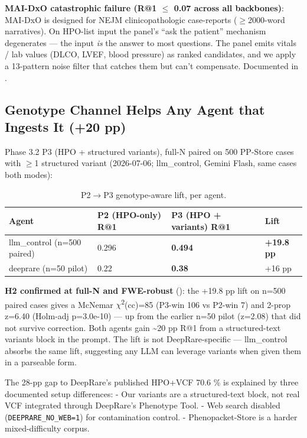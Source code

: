 \textbf{MAI-DxO catastrophic failure (R@1 \ensuremath{\leq} 0.07 across all backbones)}:
MAI-DxO is designed for NEJM clinicopathologic case-reports (\ensuremath{\geq}2000-word
narratives). On HPO-list input the panel's ``ask the patient'' mechanism
degenerates --- the input \emph{is} the answer to most questions. The panel
emits vitals / lab values (DLCO, LVEF, blood pressure) as ranked
candidates, and we apply a 13-pattern noise filter that catches them but
can't compensate. Documented in .

\subsection{Genotype Channel Helps Any Agent that Ingests It (+20 pp)}\label{sec-7-3}

Phase 3.2 P3 (HPO + structured variants), full-N paired on 500 PP-Store
cases with \ensuremath{\geq}1 structured variant (2026-07-06; llm\_control, Gemini Flash, same
cases both modes):

\begin{table}[t]
\centering\scriptsize\setlength{\tabcolsep}{3.5pt}
\caption{P2\(\rightarrow\)P3 genotype-aware lift, per agent.}\label{tbl:p3lift}
\begin{tabular}{@{}
llll@{}}
\toprule
Agent & P2 (HPO-only) R@1 & P3 (HPO + variants) R@1 & Lift \\
\midrule
llm\_control (n=500 paired) & 0.296 & \textbf{0.494} & \textbf{+19.8 pp} \\
deeprare (n=50 pilot) & 0.22 & \textbf{0.38} & +16 pp \\
\bottomrule
\end{tabular}
\end{table}

\textbf{H2 confirmed at full-N and FWE-robust} (): the +19.8 pp lift on n=500
paired cases gives a McNemar \ensuremath{\chi}\textsuperscript{2}(cc)=85 (P3-win 106 vs P2-win 7) and 2-prop
z=6.40 (Holm-adj p=3.0e-10) --- up from the earlier n=50 pilot (z=2.08) that did
not survive correction. Both agents gain \textasciitilde20 pp R@1 from a structured-text
variants block in the prompt. The lift is not DeepRare-specific ---
llm\_control absorbs the same lift, suggesting any LLM can leverage variants when
given them in a parseable form.

The 28-pp gap to DeepRare's published HPO+VCF 70.6 \% is explained by
three documented setup differences:
- Our variants are a structured-text block, not real VCF integrated through
DeepRare's Phenotype Tool.
- Web search disabled (\texttt{DEEPRARE\_NO\_WEB=1}) for contamination control.
- Phenopacket-Store is a harder mixed-difficulty corpus.

